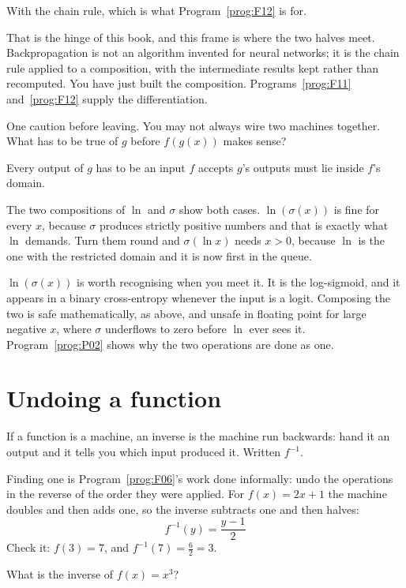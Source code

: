 \begin{fr}
\begin{ansblock}
With the chain rule, which is what Program~\ref{prog:F12} is for.
\end{ansblock}

That is the hinge of this book, and this frame is where the two halves meet.
Backpropagation is not an algorithm invented for neural networks; it is the
chain rule applied to a composition, with the intermediate results kept rather
than recomputed. You have just built the composition. Programs~\ref{prog:F11}
and~\ref{prog:F12} supply the differentiation.

One caution before leaving. You may not always wire two machines together. What
has to be true of $g$ before $f(g(x))$ makes sense?
\nextframe
\end{fr}

\begin{fr}
\begin{ansblock}
Every output of $g$ has to be an input $f$ accepts \dash{} $g$'s outputs must
lie inside $f$'s domain.
\end{ansblock}

The two compositions of $\ln$ and $\sigma$ show both cases. $\ln(\sigma(x))$ is
fine for every $x$, because $\sigma$ produces strictly positive numbers and
that is exactly what $\ln$ demands. Turn them round and $\sigma(\ln x)$ needs
$x > 0$, because $\ln$ is the one with the restricted domain and it is now
first in the queue.

\begin{note}
$\ln(\sigma(x))$ is worth recognising when you meet it. It is the log-sigmoid,
and it appears in a binary cross-entropy whenever the input is a logit.
Composing the two is safe mathematically, as above, and unsafe in floating
point for large negative $x$,
where $\sigma$ underflows to zero before $\ln$ ever sees it.
Program~\ref{prog:P02} shows why the two operations are done as one.
\end{note}
\end{fr}

\section{Undoing a function}
\label{sec:F05-inverse}

\begin{fr}
If a function is a machine, an inverse is the machine run backwards: hand it an
output and it tells you which input produced it. Written $f^{-1}$.

Finding one is Program~\ref{prog:F06}'s work done informally: undo the
operations in the reverse of the order they were applied. For $f(x) = 2x + 1$
the machine doubles and then adds one, so the inverse subtracts one and then
halves:
\[ f^{-1}(y) = \frac{y - 1}{2} \]
Check it: $f(3) = 7$, and $f^{-1}(7) = \frac{6}{2} = 3$.

What is the inverse of $f(x) = x^{3}$?
\nextframe
\end{fr}

